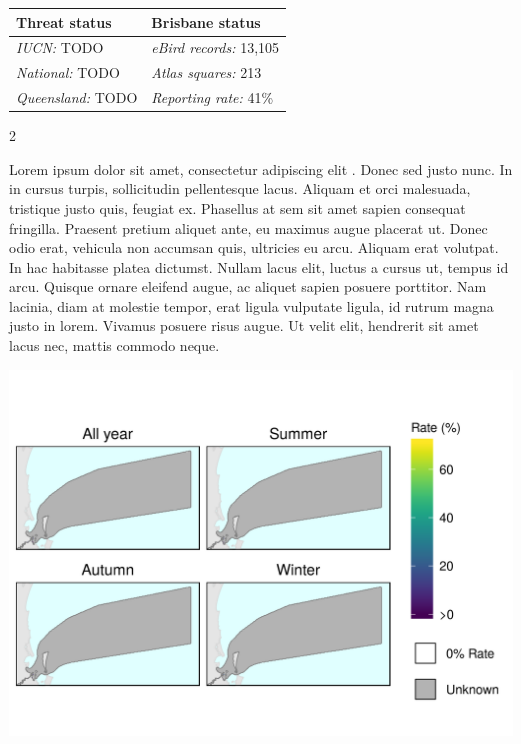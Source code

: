 \documentclass[12pt,openany,oneside]{book}
\let\origfigure\figure
\let\endorigfigure\endfigure
\renewenvironment{figure}[1][2] {
  \expandafter\origfigure\expandafter[H]
} {
  \endorigfigure
}
\let\Begin\begin
\let\End\end
\theoremstyle{definition}
\theoremstyle{definition}
\theoremstyle{definition}
\theoremstyle{remark}
\begin{document}
\begin{tabu} to 
\toprule
Threat status & Brisbane status\\
\midrule
\textit{IUCN:} TODO & \textit{eBird records:} 13,105\\
\textit{National:} TODO & \textit{Atlas squares:} 213\\
\textit{Queensland:} TODO & \textit{Reporting rate:} 41\%\\
\bottomrule
\end{tabu} 
\vspace{0.15cm}

\Begin{multicols}{2}

Lorem ipsum dolor sit amet, consectetur adipiscing elit
\citep{rexample1, rexample2, rexample3}. Donec sed justo nunc. In in
cursus turpis, sollicitudin pellentesque lacus. Aliquam et orci
malesuada, tristique justo quis, feugiat ex. Phasellus at sem sit amet
sapien consequat fringilla. Praesent pretium aliquet ante, eu maximus
augue placerat ut. Donec odio erat, vehicula non accumsan quis,
ultricies eu arcu. Aliquam erat volutpat. In hac habitasse platea
dictumst. Nullam lacus elit, luctus a cursus ut, tempus id arcu. Quisque
ornare eleifend augue, ac aliquet sapien posuere porttitor. Nam lacinia,
diam at molestie tempor, erat ligula vulputate ligula, id rutrum magna
justo in lorem. Vivamus posuere risus augue. Ut velit elit, hendrerit
sit amet lacus nec, mattis commodo neque.

\End{multicols}

\clearpage

\begin{figure}
\centering
\includegraphics[height=0.47\textheight,width=\textwidth,keepaspectratio=true]{assets/maps/Anas-superciliosa.png}
\end{figure}
\end{document}
